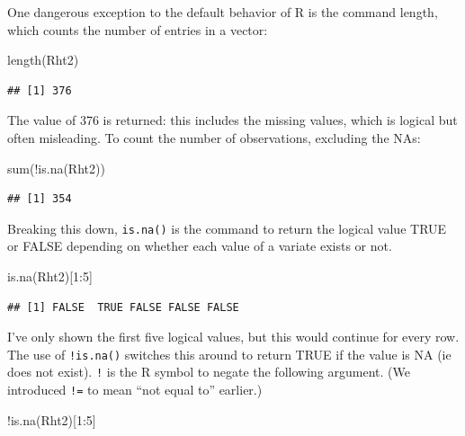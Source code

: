 \documentclass[
]{book}
\newenvironment{Shaded}{\begin{snugshade}}{\end{snugshade}}
\newcommand{\DecValTok}[1]{\textcolor[rgb]{0.00,0.00,0.81}{#1}}
\newcommand{\FunctionTok}[1]{\textcolor[rgb]{0.00,0.00,0.00}{#1}}
\newcommand{\NormalTok}[1]{#1}
\newcommand{\SpecialCharTok}[1]{\textcolor[rgb]{0.00,0.00,0.00}{#1}}
\begin{document}
One dangerous exception to the default behavior of R is the command length, which counts the number of entries in a vector:

\begin{Shaded}
\begin{Highlighting}[]
\FunctionTok{length}\NormalTok{(Rht2)}
\end{Highlighting}
\end{Shaded}

\begin{verbatim}
## [1] 376
\end{verbatim}

The value of 376 is returned: this includes the missing values, which is logical but often misleading. To count the number of observations, excluding the NAs:

\begin{Shaded}
\begin{Highlighting}[]
\FunctionTok{sum}\NormalTok{(}\SpecialCharTok{!}\FunctionTok{is.na}\NormalTok{(Rht2))}
\end{Highlighting}
\end{Shaded}

\begin{verbatim}
## [1] 354
\end{verbatim}

Breaking this down, \texttt{is.na()} is the command to return the logical value TRUE or FALSE depending on whether each value of a variate exists or not.

\begin{Shaded}
\begin{Highlighting}[]
\FunctionTok{is.na}\NormalTok{(Rht2)[}\DecValTok{1}\SpecialCharTok{:}\DecValTok{5}\NormalTok{]}
\end{Highlighting}
\end{Shaded}

\begin{verbatim}
## [1] FALSE  TRUE FALSE FALSE FALSE
\end{verbatim}

I've only shown the first five logical values, but this would continue for every row. The use of \texttt{!is.na()} switches this around to return TRUE if the value is NA (ie does not exist). \texttt{!} is the R symbol to negate the following argument. (We introduced \texttt{!=} to mean ``not equal to'' earlier.)

\begin{Shaded}
\begin{Highlighting}[]
\SpecialCharTok{!}\FunctionTok{is.na}\NormalTok{(Rht2)[}\DecValTok{1}\SpecialCharTok{:}\DecValTok{5}\NormalTok{]}
\end{Highlighting}
\end{Shaded}
\end{document}
